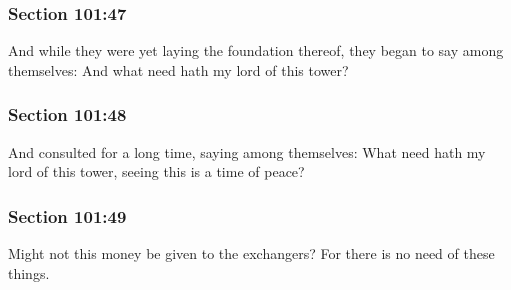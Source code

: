 	\subsubsection{Section 101:47} %
		\label{DC101-47}

		And while they were yet laying the foundation thereof, they began to say among themselves: And what need hath my lord of this tower?


	\subsubsection{Section 101:48} %
		\label{DC101-48}

		And consulted for a long time, saying among themselves: What need hath my lord of this tower, seeing this is a time of peace?


	\subsubsection{Section 101:49} %
		\label{DC101-49}

		Might not this money be given to the exchangers?  For there is no need of these things.


